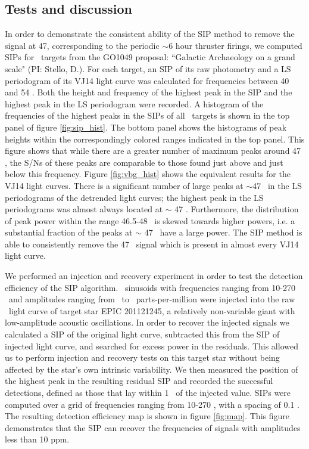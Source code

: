 \subsection{Tests and discussion}

In order to demonstrate the consistent ability of the SIP method
to remove the signal at 47\uHz, corresponding to the periodic $\sim$6 hour
thruster firings, we computed SIPs for \nGO\ targets from the GO1049
proposal: ``Galactic Archaeology on a grand scale" (PI: Stello, D.).
For each target, an SIP of its raw photometry and a LS periodogram of its
VJ14 light curve was calculated for frequencies between
40 and 54 \uHz.
Both the height and frequency of the highest peak in the SIP and the highest
peak in the LS periodogram were recorded.
A histogram of the frequencies of the highest peaks in the SIPs of all \nGO\
targets is shown in the top panel of figure \ref{fig:sip_hist}.
The bottom panel shows the histograms of peak heights within the
correspondingly colored ranges indicated in the top panel.
This figure shows that while there are a greater number of maximum peaks
around 47 \uHz, the S/Ns of these peaks are comparable to those found just
above and just below this frequency.
Figure \ref{fig:vbg_hist} shows the equivalent results for the
VJ14 light curves.
There is a significant number of large peaks at $\sim$47 \uHz\ in the LS
periodograms of the detrended light curves; the highest peak in the LS
periodograms was almost always located at $\sim$ 47 \uHz.
Furthermore, the distribution of peak power within the range 46.5-48 \uHz\ is
skewed towards higher powers, i.e. a substantial fraction of the peaks at
$\sim$ 47 \uHz\ have a large power.
The SIP method is able to consistently remove the 47 \uHz\ signal which is
present in almost every VJ14 light curve.

We performed an injection and recovery experiment in order to test the
detection efficiency of the SIP algorithm.
\Ninjections\ sinusoids with frequencies ranging from 10-270 \uHz\ and
amplitudes ranging from \minamp\ to \maxamp\ parts-per-million were injected
into the raw \ktwo\ light curve of target star EPIC 201121245, a relatively
non-variable giant with low-amplitude acoustic oscillations.
In order to recover the injected signals we calculated a SIP of the original
light curve, subtracted this from the SIP of injected light curve,
and searched for excess power in the residuals.
This allowed us to perform injection and recovery tests on this target star
without being affected by the star's own intrinsic variability.
We then measured the position of the highest peak in the resulting residual
SIP and recorded the successful detections, defined as those that lay within
1 \uHz\ of the injected value.
SIPs were computed over a grid of frequencies ranging from 10-270 \uHz, with
a spacing of 0.1 \uHz.
The resulting detection efficiency map is shown in figure \ref{fig:map}.
This figure demonstrates that the SIP can recover the frequencies of signals
with amplitudes less than 10 ppm.

